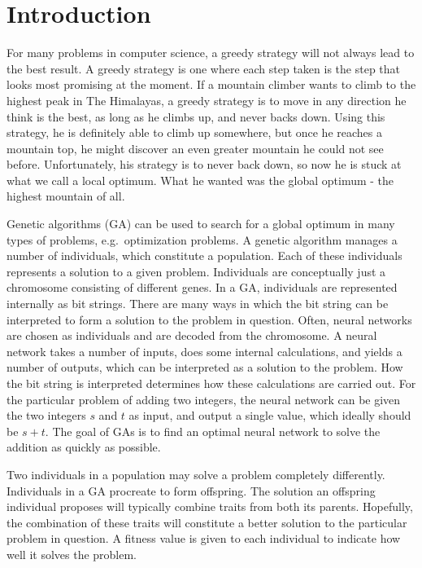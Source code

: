 \section{Introduction}
For many problems in computer science, a greedy strategy will not always lead to the best result. A greedy strategy is one where each step taken is the step that looks most promising at the moment. If a mountain climber wants to climb to the highest peak in The Himalayas, a greedy strategy is to move in any direction he think is the best, as long as he climbs up, and never backs down. Using this strategy, he is definitely able to climb up somewhere, but once he reaches a mountain top, he might discover an even greater mountain he could not see before. Unfortunately, his strategy is to never back down, so now he is stuck at what we call a local optimum. What he wanted was the global optimum - the highest mountain of all.
 
Genetic algorithms (GA) can be used to search for a global optimum in many types of problems, e.g.\ optimization problems. A genetic algorithm manages a number of individuals, which constitute a population. Each of these individuals represents a solution to a given problem. Individuals are conceptually just a chromosome consisting of different genes. In a GA, individuals are represented internally as bit strings. There are many ways in which the bit string can be interpreted to form a solution to the problem in question. Often, neural networks are chosen as individuals and are decoded from the chromosome. A neural network takes a number of inputs, does some internal calculations, and yields a number of outputs, which can be interpreted as a solution to the problem. How the bit string is interpreted determines how these calculations are carried out. For the particular problem of adding two integers, the neural network can be given the two integers $s$ and $t$ as input, and output a single value, which ideally should be $s+t$. The goal of GAs is to find an optimal neural network to solve the addition as quickly as possible.

Two individuals in a population may solve a problem completely differently. Individuals in a GA procreate to form offspring. The solution an offspring individual proposes will typically combine traits from both its parents. Hopefully, the combination of these traits will constitute a better solution to the particular problem in question. A fitness value is given to each individual to indicate how well it solves the problem.

